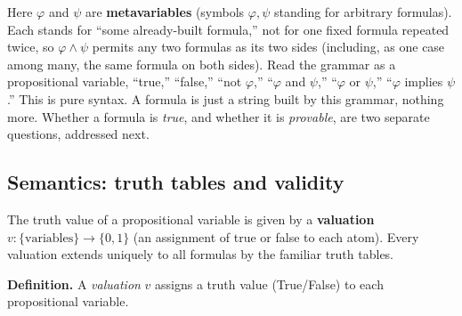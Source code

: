 Here \(\varphi\) and \(\psi\) are \textbf{metavariables} (symbols \(\varphi, \psi\) standing for arbitrary formulas). Each stands for ``some already-built formula,'' not for one fixed formula repeated twice, so \(\varphi \wedge \psi\) permits any two formulas as its two sides (including, as one case among many, the same formula on both sides). Read the grammar as a propositional variable, ``true,'' ``false,'' ``not \(\varphi\),'' ``\(\varphi\) and \(\psi\),'' ``\(\varphi\) or \(\psi\),'' ``\(\varphi\) implies \(\psi\).'' This is pure syntax. A formula is just a string built by this grammar, nothing more. Whether a formula is \emph{true}, and whether it is \emph{provable}, are two separate questions, addressed next.

\subsection{Semantics: truth tables and validity}\label{sec:04-propositions-and-proofs:02-logic-recap:3}

The truth value of a propositional variable is given by a \textbf{valuation} \(v : \{\text{variables}\} \to \{0, 1\}\) (an assignment of true or false to each atom). Every valuation extends uniquely to all formulas by the familiar truth tables.

\textbf{Definition.} A \emph{valuation} \(v\) assigns a truth value (True/False) to each propositional variable.

